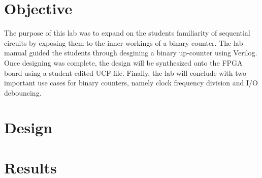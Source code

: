 \documentclass[a4paper,12pt]{article}
\begin{document}
\section*{Objective}

  \hspace{15pt}The purpose of this lab was to expand on the students familiarity of sequential circuits
  by exposing them to the inner workings of a binary counter. The lab manual guided the students
  through desgining a binary up-counter using Verilog. Once designing was complete, the design
  will be synthesized onto the FPGA board using a student edited UCF file. Finally, the lab
  will conclude with two important use cases for binary counters, namely clock frequency division
  and I/O debouncing.

\section*{Design}

  

  

  

  

  

  

  

  

\section*{Results}
\end{document}
